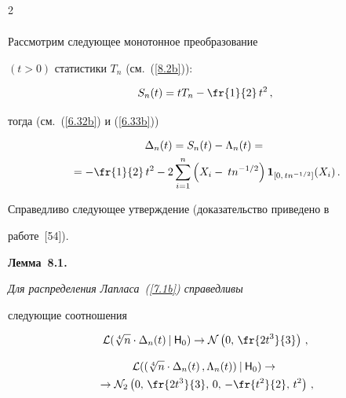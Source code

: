 \begin{multicols}{2}
\begin{multline*}


\end{multline*}


Рассмотрим следующее монотонное преобразование


$(t>0)$ статистики $T_n$ (см.~(\ref{8.2b})):


$$


S_n(t) = tT_n-\fr{1}{2}\,t^2\,,


$$


тогда (см.~(\ref{6.32b}) и (\ref{6.33b}))


\begin{multline*}


\Delta_n(t)=S_n(t)-\Lambda_n(t)={}\\


{}=-\fr{1}{2}\,t^2 -


2 \sum\limits_{i=1}^n \left (X_i-\:tn^{-1/2}\right )


\I_{[0,\,tn^{-1/2}]}(X_i)\,.




\end{multline*}


Справедливо следующее утверждение (доказательство приведено в


работе~[54]).


\medskip





\noindent


{\bf Лемма~8.1.} {\it Для распределения Лапласа~(\ref{7.1b}) справедливы


следующие соотношения


$$


{\cal L}(\sqrt[4]n \cdot  \Delta_n(t)\:|\:{\sf H}_0) \to


{\cal N}\left (0,\, \fr{2t^3}{3}\right)\,,


$$





\noindent


\begin{multline*}


{\cal L}((\sqrt[4] n\cdot \Delta_n(t)\,,\Lambda_n(t))\:|\:{\sf H}_0) \to{}\\


{}\to 


{\cal N}_2 \left (0,\, \fr{2t^3}{3},\,0,\, -\fr{t^2}{2},\, t^2\right )\,,


\end{multline*}


}
\end{multicols}
